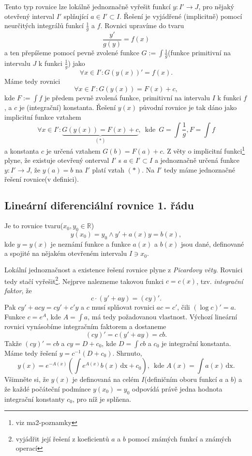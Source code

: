 \documentclass[../main.tex]{subfiles}
\begin{document}
\begin{remark}
    Tento typ rovnice lze lokálně jednoznačně vyřešit funkcí $y: I'\to J$, pro nějaký otevřený interval
    $I'$ splňující $a\in I' \subset I$. Řešení je vyjádřené (implicitně) pomocí neurčitých
    integrálů funkcí $\frac{1}{g}$ a $f$.
    Rovnici upravíme do tvaru \[\frac{y'}{g(y)} = f(x)\]
    a ten přepíšeme pomocí pevně zvolené funkce $G:= \int \frac{1}{g}$(funkce primitivní na intervalu $J$ k funkci $\frac{1}{g}$)
    jako
    \[ \forall x \in I': G(y(x))' = f(x). \]
    Máme tedy rovnici
    \[ \forall x\in I': G(y(x)) = F(x) + c, \]
    kde $F:=\int f$ je předem pevně zvolená funkce, primitivní na intervalu $I$ k funkci $f$, a $c$ je (integrační) konstanta. Řešení $y(x)$ původní
    rovnice je tak dáno jako implicitní funkce vztahem
    \[ \forall x \in I': \underbrace{G(y(x)) = F(x)+c}_{(*)}, \,\,\, \text{kde} \,\,\, G = \int \frac{1}{g}, F = \int f \]
    a konstanta $c$ je určená vztahem $G(b) = F(a) + c$. Z věty o implicitní funkci\footnote{viz ma2-poznamky} plyne, že existuje otevřený onterval $I'$ s $a\in I' \subset I$
    a jednoznačně určená funkce $y: I'\to J$, že $y(a) = b$ na $I'$ platí vztah $(*)$. Na $I'$ tedy máme jednoznačné řešení rovnice(v definici).
\end{remark}

\subsection{Lineární diferenciální rovnice 1. řádu}

\begin{remark}
    Je to rovnice tvaru($x_0,y_0 \in \mathbb{R}$) \[ y(x_0) = y_0 \land y' + a(x)y = b(x), \]
    kde $y = y(x)$ je neznámí funkce a funkce $a(x)$ a $b(x)$ jsou dané, definované a spojité na nějakém otevřeném intervalu $I \ni x_0$.
\end{remark}

\begin{remark}
    Lokální jednoznačnost a existence řešení rovnice plyne z \textit{Picardovy věty}.
    Rovnici tedy stačí vyřešit\footnote{vyjádřit její řešení z koeficientů $a$ a $b$ pomocí známých funkcí a známých operací}.
    Nejprve nalezneme takovou funkci $c = c(x)$, tzv. \textit{integrační faktor}, že
    \[ c\cdot(y' + ay) = (cy)'. \]
    Pak $cy' + acy = cy' + c'y$ a $c$ musí splňovat rovnici $ac = c'$, čili $(\log c)' = a$. Funkce
    $c=e^A$, kde $A = \int a$, má tedy požadovanou vlastnost. Výchozí lineární rovnici vynásobíme integračním faktorem a dostaneme
    \[ (cy)' = c(y'+ay) = cb. \]
    Takže $(cy)' = cb$ a $cy = D + c_0$, kde $D = \int cb$ a $c_0$ je integrační konstanta. Máme tedy
    řešení $y = c^{-1}(D+c_0)$. Shrnuto,
    \[ y(x) = e^{-A(x)} \left( \int e^{A(x)}b(x)\,\text{dx} + c_0 \right), \,\,\, \text{kde} \,\, A(x) = \int a(x)\,\text{dx}. \]
    Všimněte si, že $y(x)$ je definovaná na celém $I$(definičním oboru funkcí $a$ a $b$) a že každé počáteční podmínce $y(x_0) = y_0$
    odpovídá právě jedna hodnota integrační konstanty $c_0$, pro níž je splňena.
\end{remark}
\end{document}
